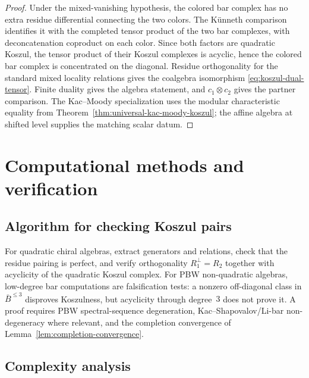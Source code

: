\begin{proof}
Under the mixed-vanishing hypothesis, the colored bar complex has no
extra residue differential connecting the two colors. The K\"unneth
comparison identifies it with the completed tensor product of the two
bar complexes, with deconcatenation coproduct on each color. Since both
factors are quadratic Koszul, the tensor product of their Koszul
complexes is acyclic, hence the colored bar complex is concentrated on
the diagonal. Residue orthogonality for the standard mixed locality
relations gives the coalgebra isomorphism
\eqref{eq:koszul-dual-tensor}. Finite duality gives the algebra
statement, and $c_1\otimes c_2$ gives the partner comparison. The
Kac--Moody specialization uses the modular characteristic equality
from Theorem~\ref{thm:universal-kac-moody-koszul}; the affine algebra
at shifted level supplies the matching scalar datum.
\end{proof}


\section{Computational methods and verification}

\subsection{Algorithm for checking Koszul pairs}

\begin{construction}\label{con:verify-koszul-pair}
For quadratic chiral algebras, extract generators and relations,
check that the residue pairing is perfect, and verify orthogonality
$R_1^\perp=R_2$ together with acyclicity of the quadratic Koszul
complex. For PBW non-quadratic algebras, low-degree bar computations
are falsification tests: a nonzero off-diagonal class in
$\bar{B}^{\leq3}$ disproves Koszulness, but acyclicity through
degree~$3$ does not prove it. A proof requires PBW spectral-sequence
degeneration, Kac--Shapovalov/Li-bar non-degeneracy where relevant,
and the completion convergence of Lemma~\ref{lem:completion-convergence}.
\end{construction}

\subsection{Complexity analysis}


